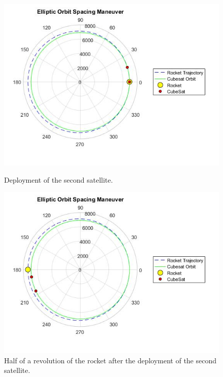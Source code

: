 \begin{figure}[H]
\includegraphics[scale=0.7]{./sections/Constellation_Deployment/S4-First_Placement/Images_S4/Picture_5_S4.jpg}
\caption{Deployment of the second satellite.}
\label{orbit3}
\includegraphics[scale=0.7]{./sections/Constellation_Deployment/S4-First_Placement/Images_S4/Picture_6_S4.jpg}
\caption{Half of a revolution of the rocket after the deployment of the second satellite.}
\label{orbit4}
\end{figure}
